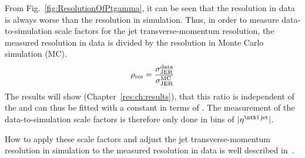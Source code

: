 From Fig.~\ref{fig:ResolutionOfPtgamma}, it can be seen that the resolution in data is always worse than the resolution in simulation.
Thus, in order to measure data-to-simulation scale factors \rhores for the jet transverse-momentum resolution, the measured resolution in data is divided by the resolution in Monte Carlo simulation (MC).
\begin{equation}
\label{res:eq:rhores}
\rho_\mathrm{res} = \frac{\sigma_\mathrm{JER}^{\text{data}}}{\sigma_\mathrm{JER}^{\text{MC}}}
\end{equation}
The results will show (Chapter~\ref{res:ch:results}), that this ratio is independent of the \ptgamma and can thus be fitted with a constant in terms of \ptgamma.
The measurement of the data-to-simulation scale factors is therefore only done in bins of $|\etafirstjet|$.

How to apply these scale factors and adjust the jet transverse-momentum resolution in simulation to the measured resolution in data is well described in~\cite{bib:Matthias_Thesis}.





\FloatBarrier
